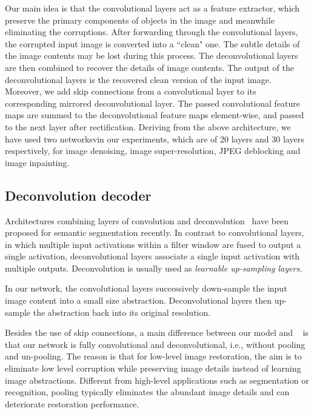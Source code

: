 Our main idea is that the convolutional layers act as a feature extractor, which preserve the
primary components of objects in the image and meanwhile eliminating the corruptions.
After forwarding through the convolutional layers, the corrupted input  image is converted into
a ``clean" one. The subtle details of the image contents may be lost during this process.
The deconvolutional layers are then combined to recover the details of image contents.
The output of the deconvolutional layers is the recovered clean version of the input image.
Moreover, we add skip connections  from a convolutional layer to its corresponding
mirrored deconvolutional layer. The passed convolutional feature maps are summed to the
deconvolutional feature maps element-wise, and passed to the next layer after rectification.
Deriving from the above architecture, we have used two networksvin our experiments, which are of 20 layers
 and 30 layers
respectively, for image denoising, image super-resolution, JPEG deblocking and image inpainting.



\subsection{Deconvolution decoder}

Architectures combining layers of convolution and deconvolution~\cite{DBLP:conf/iccv/NohHH15,
hong2015decoupled} have been proposed for semantic segmentation recently. In contrast to
convolutional layers, in which multiple input activations within a filter window are fused
to output a single activation, deconvolutional layers associate a single input activation with
multiple outputs. Deconvolution is usually used as {\em learnable up-sampling layers}.

 In our network,
the convolutional layers successively down-sample the input image content into a  small
size abstraction. Deconvolutional layers then up-sample the abstraction back into its original resolution.

Besides the use of skip connections, a main difference between our model and
~\cite{DBLP:conf/iccv/NohHH15,hong2015decoupled} is that our network is fully convolutional and
deconvolutional, i.e., without pooling and un-pooling. The reason is that for low-level image restoration,
the aim is to eliminate low level corruption while preserving image details instead of learning
image abstractions. Different from high-level applications such as segmentation or recognition,
pooling typically eliminates the abundant image details and can deteriorate restoration performance.



